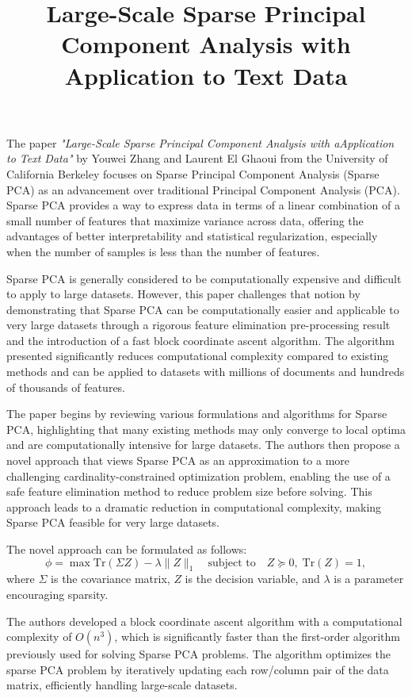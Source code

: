 \documentclass{article}
\title{Large-Scale Sparse Principal Component Analysis with Application to Text Data}
\date{}
\begin{document}
\maketitle
The paper \textit{"Large-Scale Sparse Principal Component Analysis with aApplication to Text Data"} by Youwei Zhang and Laurent El Ghaoui from the University of California Berkeley focuses on Sparse Principal Component Analysis (Sparse PCA) as an advancement over traditional Principal Component Analysis (PCA). Sparse PCA provides a way to express data in terms of a linear combination of a small number of features that maximize variance across data, offering the advantages of better interpretability and statistical regularization, especially when the number of samples is less than the number of features.

Sparse PCA is generally considered to be computationally expensive and difficult to apply to large datasets. However, this paper challenges that notion by demonstrating that Sparse PCA can be computationally easier and applicable to very large datasets through a rigorous feature elimination pre-processing result and the introduction of a fast block coordinate ascent algorithm. The algorithm presented significantly reduces computational complexity compared to existing methods and can be applied to datasets with millions of documents and hundreds of thousands of features.

The paper begins by reviewing various formulations and algorithms for Sparse PCA, highlighting that many existing methods may only converge to local optima and are computationally intensive for large datasets. The authors then propose a novel approach that views Sparse PCA as an approximation to a more challenging cardinality-constrained optimization problem, enabling the use of a safe feature elimination method to reduce problem size before solving. This approach leads to a dramatic reduction in computational complexity, making Sparse PCA feasible for very large datasets.

The novel approach can be formulated as follows:
\begin{equation}
\phi = \max \mathrm{Tr}(\Sigma Z) - \lambda \|Z\|_1 \quad \text{subject to} \quad Z \succeq 0, \; \mathrm{Tr}(Z) = 1,
\end{equation}
where \(\Sigma\) is the covariance matrix, \(Z\) is the decision variable, and \(\lambda\) is a parameter encouraging sparsity.

The authors developed a block coordinate ascent algorithm with a computational complexity of \(O(n^3)\), which is significantly faster than the first-order algorithm previously used for solving Sparse PCA problems. The algorithm optimizes the sparse PCA problem by iteratively updating each row/column pair of the data matrix, efficiently handling large-scale datasets.
\end{document}
